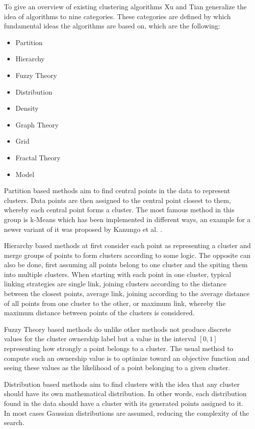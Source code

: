 \documentclass[
	a4paper,
	english,
	twoside,
	openright,               
	11pt                            
	]{report}
\begin{document}
To give an overview of existing clustering algorithms Xu and Tian \cite{surveyclustering} generalize the idea of algorithms to nine categories. These categories are defined by which fundamental ideas the algorithms are based on, which are the following:
\begin{itemize}
  \item Partition
  \item Hierarchy
  \item Fuzzy Theory
  \item Distribution
  \item Density
  \item Graph Theory
  \item Grid
  \item Fractal Theory
  \item Model
\end{itemize}

Partition based methods aim to find central points in the data to represent clusters. Data points are then assigned to the central point closest to them, whereby each central point forms a cluster. The most famous method in this group is k-Means which has been implemented in different ways, an example for a newer variant of it was proposed by Kanungo et al. \cite{1017616}.

Hierarchy based methods at first consider each point as representing a cluster and merge groups of points to form clusters according to some logic. The opposite can also be done, first assuming all points belong to one cluster and the spiting them into multiple clusters. When starting with each point in one cluster, typical linking strategies are single link, joining clusters according to the distance between the closest points, average link, joining according to the average distance of all points from one cluster to the other, or maximum link, whereby the maximum distance between points of the clusters is considered.

Fuzzy Theory based methods do unlike other methods not produce discrete values for the cluster ownership label but a value in the interval $[0,1]$ representing how strongly a point belongs to a cluster. The usual method to compute such an ownership value is to optimize toward an objective function and seeing these values as the likelihood of a point belonging to a given cluster.

Distribution based methods aim to find clusters with the idea that any cluster should have its own mathematical distribution. In other words, each distribution found in the data should have a cluster with its generated points assigned to it. In most cases Gaussian distributions are assumed, reducing the complexity of the search.
\end{document}
